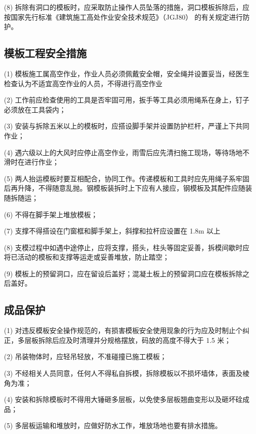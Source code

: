 (8) 拆除有洞口的模板时，应采取防止操作人员坠落的措施，洞口模板拆除后，应按国家先行标准《建筑施工高处作业安全技术规范》（JGJ80）
的有关规定进行防护。

\subsection{模板工程安全措施}

(1) 模板施工属高空作业，作业人员必须佩戴安全帽，安全绳并设置妥当，经医生检查认为不适宜高空作业的人员，不得进行高空作业

(2) 工作前应检查使用的工具是否牢固可用，扳手等工具必须用绳系在身上，钉子必须放在工具袋内；

(3) 安装与拆除五米以上的模板时，应搭设脚手架并设置防护栏杆，严谨上下共同作业；

(4) 遇六级以上的大风时应停止高空作业，雨雪后应先清扫施工现场，等待场地不滑时在进行作业；

(5) 两人抬运模板时要互相配合，协同工作。传递模板和工具时应先用绳子系牢固后再升降，不得随意乱抛。钢模板装拆时上下应有人接应，钢模板及其配件应随装随拆随运；

(6) 不得在脚手架上堆放模板；

(7) 支撑不得搭设在门窗框和脚手架上，斜撑和拉杆应设置在 1.8m 以上

(8) 支模过程中如遇中途停止，应将支撑，搭头，柱头等固定妥善，拆模间歇时应将已活动的模板和支撑等运走或妥善堆放，防止踏空；

(9) 模板上的预留洞口，应在留设后盖好；混凝土板上的预留洞口应在模板拆除之后盖好。

\subsection{成品保护}

(1) 对违反模板安全操作规范的，有损害模板安全使用现象的行为应及时制止个纠正，多层板拆除后应及时清理并分规格摆放，码放的高度不得大于 1.5 米；

(2) 吊装物体时，应轻吊轻放，不准碰撞已施工模板；

(3) 不经相关人员同意，任何人不得私自拆模，拆除模板以不损坏墙体，表面及棱角为准；

(4) 安装和拆除模板时不得用大锤砸多层板，以免使多层板翘曲变形以及砸坏硂成品；

(5) 多层板运输和堆放时，应做好防水工作，堆放场地也要有排水措施。

